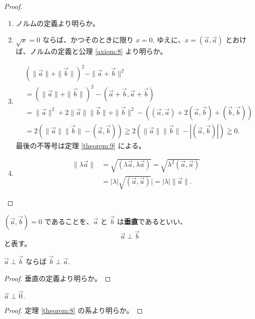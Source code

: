 \begin{proof}
  \begin{enumerate}
    \item ノルムの定義より明らか。
    \item \(\sqrt{x}=0\) ならば、かつそのときに限り \(x=0.\)
    ゆえに、\(x=(\vec{a},\vec{a})\) とおけば、ノルムの定義と公理 \ref{axiom:8} より明らか。
    \item
      \begin{align*}
        &(\|\vec{a}\|+\|\vec{b}\|)^2-\|\vec{a}+\vec{b}\|^2 \\
        &= (\|\vec{a}\|+\|\vec{b}\|)^2-(\vec{a}+\vec{b},\vec{a}+\vec{b}) \\
        &= \|\vec{a}\|^2+2\|\vec{a}\|\|\vec{b}\|+\|\vec{b}\|^2-((\vec{a},\vec{a})+2(\vec{a},\vec{b})+(\vec{b},\vec{b})) \\
        &= 2(\|\vec{a}\|\|\vec{b}\|-(\vec{a},\vec{b}))\geqq2(\|\vec{a}\|\|\vec{b}\|-|(\vec{a},\vec{b})|)\geqq0.
      \end{align*}
      最後の不等号は定理 \ref{theorem:9} による。
    \item
      \begin{align*}
        \|\lambda\vec{a}\| &= \sqrt{(\lambda\vec{a},\lambda\vec{a})}=\sqrt{\lambda^2(\vec{a},\vec{a})} \\
                           &= |\lambda|\sqrt{(\vec{a},\vec{a})}|=|\lambda|\|\vec{a}\|.
      \end{align*}
  \end{enumerate}
\end{proof}

\begin{dfn}[ベクトルの垂直]\label{definition:20}
  \((\vec{a},\vec{b})=0\) であることを、\(\vec{a}\) と \(\vec{b}\) は\textbf{垂直}であるといい、
  \[\vec{a}\perp\vec{b}\]
  と表す。
\end{dfn}

\begin{thm}\label{theorem:11}
  \(\vec{a}\perp\vec{b}\) ならば \(\vec{b}\perp\vec{a}.\)
\end{thm}

\begin{proof}
  垂直の定義より明らか。
\end{proof}

\begin{thm}\label{theorem:12}
  \(\vec{a}\perp\vec{0}.\)
\end{thm}

\begin{proof}
  定理 \ref{theorem:8} の系より明らか。
\end{proof}

